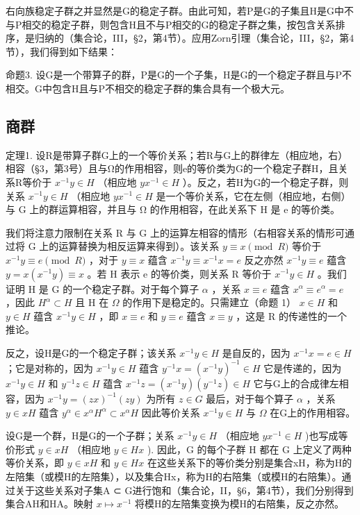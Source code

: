 右向族稳定子群之并显然是G的稳定子群。由此可知，若P是G的子集且H是G中不与P相交的稳定子群，则包含H且不与P相交的G的稳定子群之集，按包含关系排序，是归纳的（集合论，III，§2，第4节）。应用Zorn引理（集合论，III，§2，第4节），我们得到如下结果：

命题3. 设G是一个带算子的群，P是G的一个子集，H是G的一个稳定子群且与P不相交。G中包含H且与P不相交的稳定子群的集合具有一个极大元。

\subsection{商群}

定理1. 设R是带算子群G上的一个等价关系；若R与G上的群律左（相应地，右）相容（§3，第3号）且与Ω的作用相容，则e的等价类为G的一个稳定子群H，且关系R等价于 \(x^{-1}y \in H\) （相应地 \(yx^{-1} \in H\) ）。反之，若H为G的一个稳定子群，则关系 \(x^{-1}y \in H\) （相应地 \(yx^{-1} \in H\) 是一个等价关系，它在左侧（相应地，右侧）与 G 上的群运算相容，并且与 Ω 的作用相容，在此关系下 H 是 e 的等价类。

我们将注意力限制在关系 R 与 G 上的运算左相容的情形（右相容关系的情形可通过将 G 上的运算替换为相反运算来得到）。该关系 \(y \equiv x \pmod{R}\) 等价于 \(x^{-1}y \equiv e \pmod{R}\) ，对于 \(y \equiv x\) 蕴含 \(x^{-1}y \equiv x^{-1}x = e\) 反之亦然 \(x^{-1}y \equiv e\) 蕴含 \(y = x(x^{-1}y) \equiv x\) 。若 H 表示 e 的等价类，则关系 R 等价于 \(x^{-1}y \in H\) 。我们证明 H 是 G 的一个稳定子群。对于每个算子 \(\alpha\) ，关系 \(x \equiv e\) 蕴含 \(x^{\alpha} \equiv e^{\alpha} = e\) ，因此 \(H^{\alpha} \subset H\) 且 H 在 \(\Omega\) 的作用下是稳定的。只需建立（命题 1） \(x \in H\) 和 \(y \in H\) 蕴含 \(x^{-1}y \in H\) ，即 \(x \equiv e\) 和 \(y \equiv e\) 蕴含 \(x \equiv y\) ，这是 R 的传递性的一个推论。

反之，设H是G的一个稳定子群；该关系 \(x^{-1}y \in H\) 是自反的，因为 \(x^{-1}x = e \in H\) ；它是对称的，因为 \(x^{-1}y \in H\) 蕴含 \(y^{-1}x = (x^{-1}y)^{-1} \in H\) 它是传递的，因为 \(x^{-1}y \in H\) 和 \(y^{-1}z \in H\) 蕴含 \(x^{-1}z = (x^{-1}y)(y^{-1}z) \in H\) 它与G上的合成律左相容，因为 \(x^{-1}y = (zx)^{-1}(zy)\) 为所有 \(z \in G\) 最后，对于每个算子 \(\alpha\) ，关系 \(y \in xH\) 蕴含 \(y^{\alpha} \in x^{\alpha}H^{\alpha} \subset x^{\alpha}H\) 因此等价关系 \(x^{-1}y \in H\) 与 \(\Omega\) 在G上的作用相容。

设G是一个群，H是G的一个子群；关系 \(x^{-1}y \in H\) （相应地 \(yx^{-1} \in H\) )也写成等价形式 \(y \in xH\) （相应地 \(y \in Hx\) ). 因此，G 的每个子群 H 都在 G 上定义了两种等价关系，即 \(y \in xH\) 和 \(y \in Hx\) 在这些关系下的等价类分别是集合xH，称为H的左陪集（或模H的左陪集），以及集合Hx，称为H的右陪集（或模H的右陪集）。通过关于这些关系对子集A ⊂ G进行饱和（集合论，II，§6，第4节），我们分别得到集合AH和HA。映射 \(x \mapsto x^{-1}\) 将模H的左陪集变换为模H的右陪集，反之亦然。

